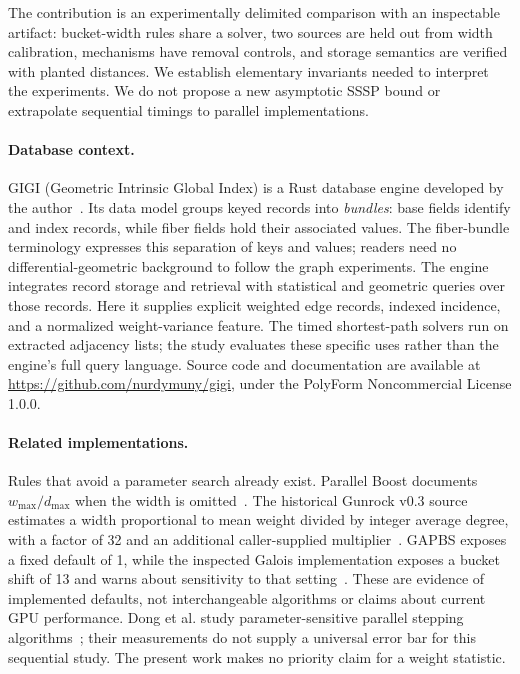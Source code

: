 \documentclass[11pt]{article}
\begin{document}
The contribution is an experimentally delimited comparison with an inspectable
artifact: bucket-width rules share a solver, two sources are held out from
width calibration, mechanisms have removal controls, and storage semantics are
verified with planted distances. We establish elementary invariants needed to
interpret the experiments. We do not propose a new asymptotic SSSP bound or
extrapolate sequential timings to parallel implementations.

\paragraph{Database context.}
GIGI (Geometric Intrinsic Global Index) is a Rust database engine developed by
the author~\cite{gigi}. Its data model groups keyed records into \emph{bundles}:
base fields identify and index records, while fiber fields hold their associated
values. The fiber-bundle terminology expresses this separation of keys and
values; readers need no differential-geometric background to follow the graph
experiments. The engine integrates record storage and retrieval with statistical
and geometric queries over those records. Here it supplies explicit weighted
edge records, indexed incidence, and a normalized weight-variance feature.
The timed shortest-path solvers run on extracted adjacency lists; the study
evaluates these specific uses rather than the engine's full query language.
Source code and documentation are available at
\url{https://github.com/nurdymuny/gigi}, under the PolyForm Noncommercial
License 1.0.0.

\paragraph{Related implementations.}
Rules that avoid a parameter search already exist. Parallel Boost documents
$w_{\max}/d_{\max}$ when the width is omitted~\cite{boost}. The historical
Gunrock v0.3 source estimates a width proportional to mean weight divided by
integer average degree, with a factor of 32 and an additional caller-supplied
multiplier~\cite{gunrock}. GAPBS exposes a fixed default of 1, while the inspected
Galois implementation exposes a bucket shift of 13 and warns about sensitivity
to that setting~\cite{gapbs,galois}. These are evidence of implemented defaults,
not interchangeable algorithms or claims about current GPU performance.
Dong et al. study parameter-sensitive parallel stepping algorithms~\cite{dong};
their measurements do not supply a universal error bar for this sequential study.
The present work makes no priority claim for a weight statistic.
\end{document}
